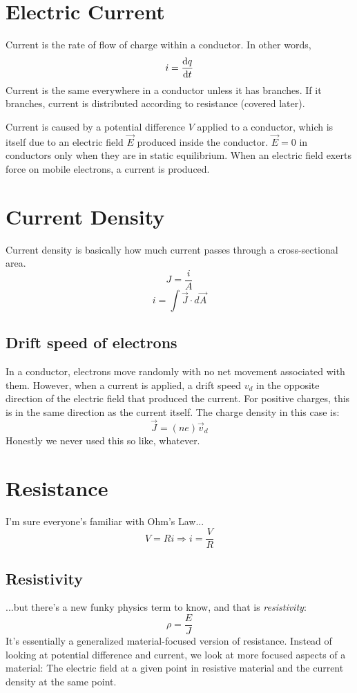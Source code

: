 \documentclass[]{article}
\begin{document}
\section{Electric Current}
Current is the rate of flow of charge within a conductor. In other words,
\[ i = \dv{q}{t} \]
Current is the same everywhere in a conductor unless it has branches. If it branches, current is distributed according to resistance (covered later).

Current is caused by a potential difference $ V $ applied to a conductor, which is itself due to an electric field $ \vec{E} $ produced inside the conductor. $ \vec{E} = 0 $ in conductors only when they are in static equilibrium. When an electric field exerts force on mobile electrons, a current is produced.

\section{Current Density}
Current density is basically how much current passes through a cross-sectional area.
\[ J = \frac{i}{A} \]
\[ i = \int \vec{J} \cdot d\vec{A} \]

\subsection{Drift speed of electrons}
In a conductor, electrons move randomly with no net movement associated with them. However, when a current is applied, a drift speed $ v_d $ in the opposite direction of the electric field that produced the current. For positive charges, this is in the same direction as the current itself. The charge density in this case is:
\[ \vec{J} = \left(ne\right)\vec{v}_d \]
Honestly we never used this so like, whatever.

\section{Resistance}
I'm sure everyone's familiar with Ohm's Law...
\[ V = Ri \Rightarrow i = \frac{V}{R} \]

\subsection{Resistivity}
...but there's a new funky physics term to know, and that is \emph{resistivity}:
\[ \rho = \frac{E}{J} \]
It's essentially a generalized material-focused version of resistance. Instead of looking at potential difference and current, we look at more focused aspects of a material: The electric field at a given point in resistive material and the current density at the same point.
\end{document}
